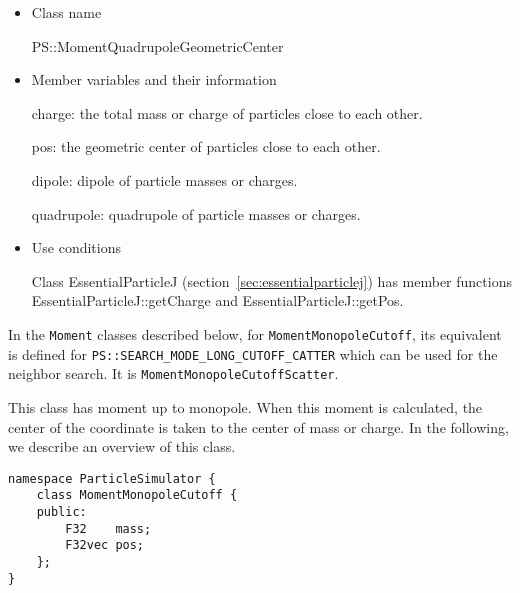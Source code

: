 \begin{itemize}
\item Class name

  PS::MomentQuadrupoleGeometricCenter

\item Member variables and their information

  charge: the total mass or charge of particles close to each other.

  pos: the geometric center of particles close to each other.

  dipole: dipole of particle masses or charges.

  quadrupole: quadrupole of particle masses or charges.

\item Use conditions

  Class EssentialParticleJ (section~\ref{sec:essentialparticlej}) has
  member functions EssentialParticleJ::getCharge and
  EssentialParticleJ::getPos.

\end{itemize}


In the \texttt{Moment} classes described below,
for \texttt{MomentMonopoleCutoff},
its equivalent is defined for
\texttt{PS::SEARCH\_MODE\_LONG\_CUTOFF\_CATTER} which can be used for the
neighbor search. It is  \texttt{MomentMonopoleCutoffScatter}.


This class has moment up to monopole. When this moment is calculated,
the center of the coordinate is taken to the center of mass or
charge. In the following, we describe an overview of this class.
\begin{screen}
\begin{verbatim}
namespace ParticleSimulator {
    class MomentMonopoleCutoff {
    public:
        F32    mass;
        F32vec pos;
    };
}
\end{verbatim}
\end{screen}

